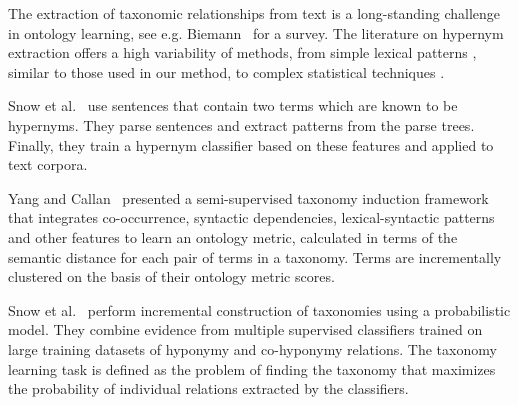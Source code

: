 \documentclass[11pt,letterpaper]{article}
\begin{document}
The extraction of taxonomic relationships from text is a long-standing challenge in ontology learning, see e.g. Biemann~ for a survey. The literature on hypernym extraction offers a high variability of methods, from simple lexical patterns \cite{hearst1992automatic,Oakes:05}, similar to those used in our method, to complex  statistical techniques \cite{Agirreetal:00,Ritteretal:09}. 

Snow et al.~ use sentences that contain two terms which are known to be hypernyms. They parse sentences and extract patterns from the parse trees. Finally, they train a hypernym classifier based on these features and applied to text corpora. %

Yang and Callan~ presented a semi-supervised taxonomy induction framework that integrates co-occurrence, syntactic dependencies, lexical-syntactic patterns and other features to learn an ontology metric, calculated in terms of the semantic distance for each pair of terms in a taxonomy. Terms are incrementally clustered on the basis of their ontology metric scores. %

Snow et al.~ perform incremental construction of taxonomies using a probabilistic model. They combine evidence from multiple supervised classifiers trained on large training datasets of hyponymy and co-hyponymy relations. The taxonomy learning task is defined  as the problem of finding the taxonomy that maximizes the probability of individual relations extracted by the classifiers. %

\end{document}
